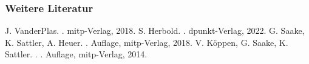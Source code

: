   
  \begin{frame}
    \frametitle{Weitere Literatur}
  
    \begin{thebibliography}{Ester, 2000}
     J. VanderPlas.
     . 
     \newblock mitp-Verlag, 2018.  
     S. Herbold.
     . 
     \newblock dpunkt-Verlag, 2022.    
     G. Saake, K. Sattler, A. Heuer.
     . Auflage, mitp-Verlag, 2018.
     V. Köppen, G. Saake, K. Sattler.
     . 
     . Auflage, mitp-Verlag, 2014.    

  \end{thebibliography}
  
  \end{frame}
  